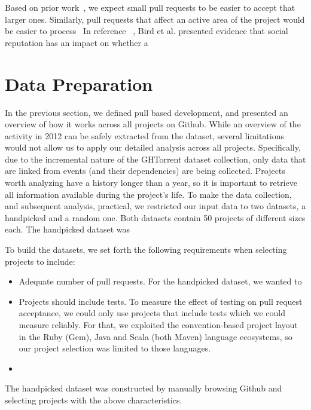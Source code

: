 \documentclass{sig-alternate}
\begin{document}
Based on prior work~\cite{Weiss08}, we expect small pull requests to be easier to accept that larger ones. Similarly, pull requests that affect an active
area of the project would be easier to process~
In reference ~\cite{Bird07}, Bird et al. presented evidence that social
reputation has an impact on whether a


\section{Data Preparation}

In the previous section, we defined pull based development, and presented an
overview of how it works across all projects on Github. While an overview of the
activity in 2012 can be safely extracted from the dataset, several limitations
would not allow us to apply our detailed analysis across all projects.
Specifically, due to the incremental nature of the GHTorrent dataset collection,
only data that are linked from events (and their dependencies) are being
collected. Projects worth analyzing have a history longer than a year, so it is
important to retrieve all information available during the project's life. To
make the data collection, and subsequent analysis, practical, we restricted our
input data to two datasets, a \textsf{handpicked} and a \textsf{random} one. 
Both datasets contain 50 projects of different sizes each. The 
\textsf{handpicked} dataset was 


To build the datasets, we set forth the following requirements when selecting
projects to include:

\begin{itemize}

  \item Adequate number of pull requests. For the \textsf{handpicked} dataset,
    we wanted to 

  \item Projects should include tests. To measure the effect of testing on pull
    request acceptance, we could only use projects that include tests which we
    could measure reliably. For that, we exploited the convention-based project
    layout in the Ruby (Gem), Java and Scala (both Maven) language ecosystems,
    so our project selection was limited to those languages. 

  \item 

\end{itemize}

The \textsf{handpicked} dataset was constructed by manually browsing Github
and selecting projects with the above characteristics.  
\end{document}
